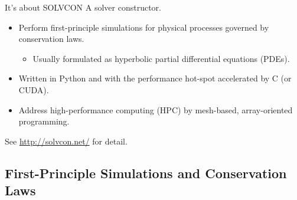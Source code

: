 \documentclass[dvips,xcolor=pst,14pt]{beamer}
\begin{document}
\begin{frame}{
%
It's about SOLVCON
%
}
 A solver constructor.
\begin{itemize}
  \item Perform first-principle simulations for physical processes governed
  by conservation laws.
  \begin{itemize}
    \item Usually formulated as hyperbolic partial differential equations
    (PDEs).
  \end{itemize}
  \item Written in \alert{Python} and with the performance hot-spot
  accelerated by C (or CUDA).
  \item Address \alert{high-performance computing (HPC)} by mesh-based,
  array-oriented programming.
\end{itemize}
See \url{http://solvcon.net/} for detail.
\end{frame}

\subsection{
First-Principle Simulations and Conservation Laws
}

\end{document}
